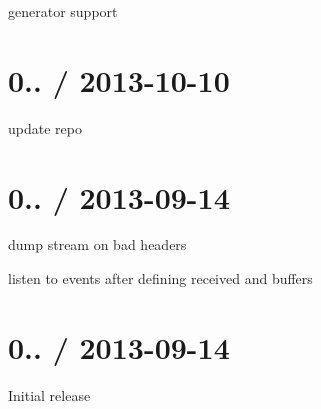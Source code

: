 \begin{DoxyItemize}
\item generator support
\end{DoxyItemize}

\section*{0.. / 2013-\/10-\/10 }


\begin{DoxyItemize}
\item update repo
\end{DoxyItemize}

\section*{0.. / 2013-\/09-\/14 }


\begin{DoxyItemize}
\item dump stream on bad headers
\item listen to events after defining received and buffers
\end{DoxyItemize}

\section*{0.. / 2013-\/09-\/14 }


\begin{DoxyItemize}
\item Initial release 
\end{DoxyItemize}